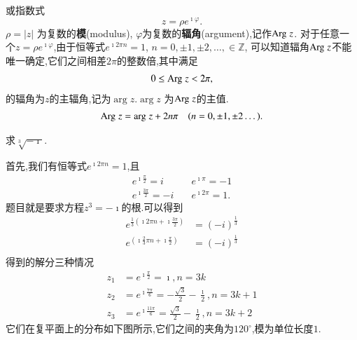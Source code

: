 或指数式
\begin{equation}
    z = \rho e^{\imath \varphi} .
\end{equation}
$\rho = |z|$ 为复数的{\bf 模}(modulus), $\varphi$为复数的{\bf 辐角}(argument),记作${\mathrm{Arg}\;} z$.
对于任意一个$z=\rho e^{\imath \varphi}$,由于恒等式$e^{\imath 2\pi n} = 1$, $n = 0, \pm 1, \pm 2, \dots, \in \mathbb{Z}$,
可以知道辐角${\mathrm{Arg}\;} z$不能唯一确定,它们之间相差$2\pi$的整数倍,其中满足
\begin{align}
    0 \leq {\mathrm{Arg}\;} z < 2\pi ,
\end{align}
的辐角为$z$的主辐角,记为$\arg z$.$\arg z$ 为${\mathrm{Arg}\;} z$的主值.
\begin{align}
    {\mathrm{Arg}\;} z = {\mathrm{arg}\;} z + 2 n \pi \quad (n = 0, \pm 1, \pm 2\dots).
\end{align}


\begin{example}
求$\sqrt[3]{-\imath}$.
\end{example}
\begin{solution}
    首先,我们有恒等式$e^{\imath 2\pi n} = 1$,且
    \begin{align*}
        e^{\imath \frac{\pi}{2}}  = i & \quad  e^{\imath \pi}  =-1 \\
        e^{\imath \frac{3\pi}{2}} = -i & \quad e^{\imath 2\pi} = 1.
    \end{align*}
题目就是要求方程$z^3 =-\imath$的根.可以得到
    \begin{align*}
        e^{\frac{1}{3}(\imath 2\pi n + \imath \frac{3\pi}{2})} & = (-i)^{\frac{1}{3}} \\
        e^{(\imath \frac{2}{3}\pi n + \imath \frac{\pi}{2})}   & =  (-i)^{\frac{1}{3}} \\
    \end{align*}
得到的解分三种情况
    \begin{align*}
        z_1 &=e^{\imath \frac{\pi}{2}} = \imath , n = 3k \\
        z_2 &=e^{\imath \frac{7\pi}{6}} = -\frac{\sqrt{3}}{2} - \frac{\imath}{2} , n = 3k +1 \\
        z_3 &=e^{\imath \frac{11\pi}{6}} = \frac{\sqrt{3}}{2} - \frac{\imath}{2} , n = 3k +2 
    \end{align*}
它们在复平面上的分布如下图所示,它们之间的夹角为$120^\circ$,模为单位长度$1$.
        \centering 
        
\end{solution}

